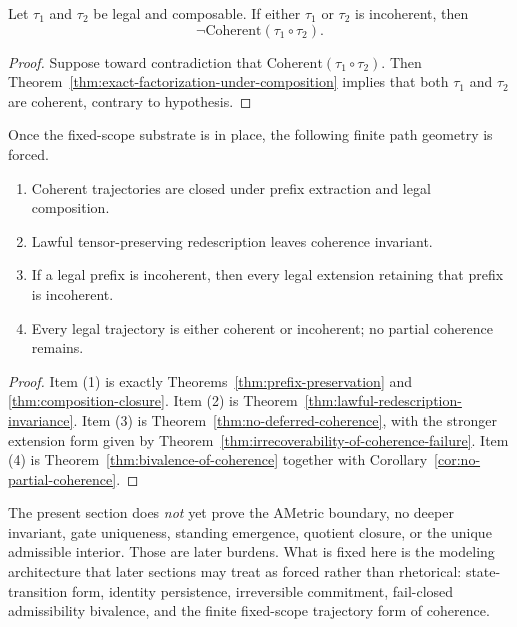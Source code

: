 \begin{corollary}
\label{cor:no-coherence-by-aggregation}
Let $\tau_1$ and $\tau_2$ be legal and composable. If either $\tau_1$ or $\tau_2$ is incoherent, then
\[
\neg\mathrm{Coherent}(\tau_1\circ \tau_2).
\]
\end{corollary}

\begin{proof}
Suppose toward contradiction that $\mathrm{Coherent}(\tau_1\circ \tau_2)$. Then Theorem~\ref{thm:exact-factorization-under-composition} implies that both $\tau_1$ and $\tau_2$ are coherent, contrary to hypothesis.\cite{MaleyTrajectory}
\end{proof}

\begin{theorem}
\label{thm:trajectory-architecture-fixed}
Once the fixed-scope substrate is in place, the following finite path geometry is forced.
\begin{enumerate}
  \item Coherent trajectories are closed under prefix extraction and legal composition.
  \item Lawful tensor-preserving redescription leaves coherence invariant.
  \item If a legal prefix is incoherent, then every legal extension retaining that prefix is incoherent.
  \item Every legal trajectory is either coherent or incoherent; no partial coherence remains.
\end{enumerate}
\end{theorem}

\begin{proof}
Item (1) is exactly Theorems~\ref{thm:prefix-preservation} and \ref{thm:composition-closure}. Item (2) is Theorem~\ref{thm:lawful-redescription-invariance}. Item (3) is Theorem~\ref{thm:no-deferred-coherence}, with the stronger extension form given by Theorem~\ref{thm:irrecoverability-of-coherence-failure}. Item (4) is Theorem~\ref{thm:bivalence-of-coherence} together with Corollary~\ref{cor:no-partial-coherence}.\cite{MaleyTrajectory}
\end{proof}

\begin{remark}
The present section does \emph{not} yet prove the AMetric boundary, no deeper invariant, gate uniqueness, standing emergence, quotient closure, or the unique admissible interior. Those are later burdens. What is fixed here is the modeling architecture that later sections may treat as forced rather than rhetorical: state-transition form, identity persistence, irreversible commitment, fail-closed admissibility bivalence, and the finite fixed-scope trajectory form of coherence.
\end{remark}

